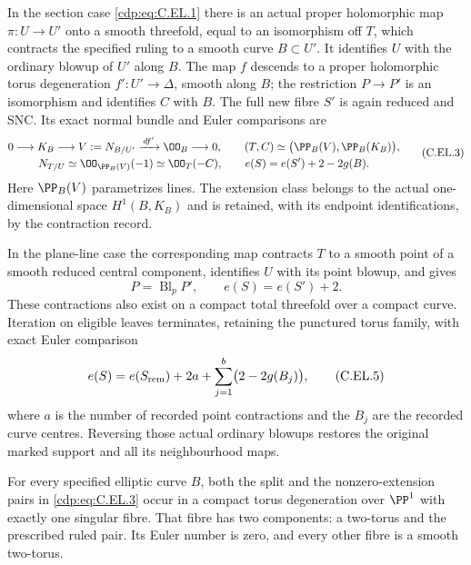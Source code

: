 \begin{proposition}
In the section case \eqref{cdp:eq:C.EL.1} there is an actual proper holomorphic
map $\pi:U\to U'$ onto a smooth threefold, equal to an isomorphism
off $T$, which contracts the specified ruling to a smooth curve
$B\subset U'$. It identifies $U$ with the ordinary blowup of $U'$
along $B$. The map $f$ descends to a proper holomorphic torus
degeneration $f':U'\to\Delta$, smooth along $B$; the restriction
$P\to P'$ is an isomorphism and identifies $C$ with $B$.
The full new fibre $S'$ is again reduced and SNC. Its exact normal
bundle and Euler comparisons are
\[
\begin{gathered}
 0\longrightarrow K_B\longrightarrow V:=N_{B/U'}
        \xrightarrow{\,df'\,}\OO_B\longrightarrow0,\qquad
 (T,C)\simeq\bigl(\PP_B(V),\PP_B(K_B)\bigr),\\
 N_{T/U}\simeq\OO_{\PP_B(V)}(-1)\simeq\OO_T(-C),\qquad
 e(S)=e(S')+2-2g(B).
\end{gathered}                                                   \tag{C.EL.3}\label{cdp:eq:C.EL.3}
\]
Here $\PP_B(V)$ parametrizes lines. The extension class belongs
to the actual one-dimensional space $H^1(B,K_B)$ and is retained,
with its endpoint identifications, by the contraction record.

In the plane-line case the corresponding map contracts $T$ to a
smooth point of a smooth reduced central component, identifies
$U$ with its point blowup, and gives
\[
       P=\operatorname{Bl}_{p}P',\qquad e(S)=e(S')+2.
                                                        \tag{C.EL.4}\label{cdp:eq:C.EL.4}
\]
These contractions also exist on a compact total threefold over a
compact curve. Iteration on eligible leaves terminates, retaining
the punctured torus family, with exact Euler comparison
\[
 e(S)=e(S_{\rm rem})+2a+\sum_{j=1}^{b}\bigl(2-2g(B_j)\bigr),
                                                        \tag{C.EL.5}\label{cdp:eq:C.EL.5}
\]
where $a$ is the number of recorded point contractions and the
$B_j$ are the recorded curve centres. Reversing those actual
ordinary blowups restores the original marked support and all
its neighbourhood maps.

For every specified elliptic curve $B$, both the split and the
nonzero-extension pairs in \eqref{cdp:eq:C.EL.3} occur in a compact torus
degeneration over $\PP^1$ with exactly one singular fibre. That
fibre has two components: a two-torus and the prescribed ruled
pair. Its Euler number is zero, and every other fibre is a smooth
two-torus.
\end{proposition}

